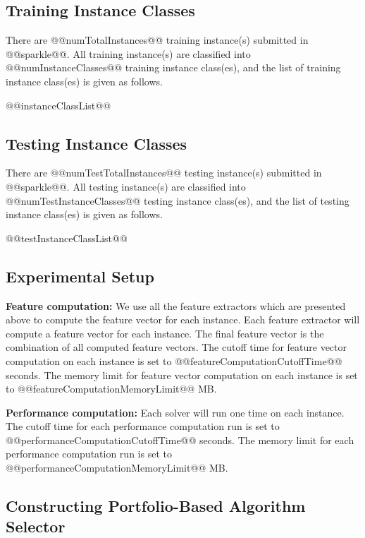 \documentclass[british]{article}
\begin{document}
\subsection{Training Instance Classes}
\label{sec:Training_Instance_Classes}
There are @@numTotalInstances@@ training instance(s) submitted in @@sparkle@@. All training instance(s) are classified into @@numInstanceClasses@@ training instance class(es), and the list of training instance class(es) is given as follows.

\begin{enumerate}
@@instanceClassList@@
\end{enumerate}

\subsection{Testing Instance Classes}
\label{sec:Testing_Instance_Classes}
There are @@numTestTotalInstances@@ testing instance(s) submitted in @@sparkle@@. All testing instance(s) are classified into @@numTestInstanceClasses@@ testing instance class(es), and the list of testing instance class(es) is given as follows.

\begin{enumerate}
@@testInstanceClassList@@
\end{enumerate}

\subsection{Experimental Setup}
\label{sec:Experimental_Setup}

\textbf{Feature computation:} We use all the feature extractors which are presented above to compute the feature vector for each instance. Each feature extractor will compute a feature vector for each instance. The final feature vector is the combination of all computed feature vectors. The cutoff time for feature vector computation on each instance is set to @@featureComputationCutoffTime@@ seconds. The memory limit for feature vector computation on each instance is set to @@featureComputationMemoryLimit@@ MB.

\textbf{Performance computation:} Each solver will run one time on each instance. The cutoff time for each performance computation run is set to @@performanceComputationCutoffTime@@ seconds. The memory limit for each performance computation run is set to @@performanceComputationMemoryLimit@@ MB.

\subsection{Constructing Portfolio-Based Algorithm Selector}
\label{sec:Portfolio}
\end{document}
